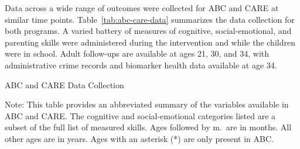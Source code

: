 Data across a wide range of outcomes were collected for ABC and CARE at similar time points. Table~\ref{tab:abc-care-data} summarizes the data collection for both programs. A varied battery of measures of cognitive, social-emotional, and parenting skills were administered during the intervention and while the children were in school. Adult follow-ups are available at ages 21, 30, and 34, with administrative crime records and biomarker health data available at age 34.

\begin{table}[H]
\centering
\caption{ABC and CARE Data Collection}
\label{tab:abc-care-data}
\begin{threeparttable}
\footnotesize
	
\begin{tablenotes}
\item Note: This table provides an abbreviated summary of the variables available in ABC and CARE. The cognitive and social-emotional categories listed are a subset of the full list of measured skills. Ages followed by m.\ are in months. All other ages are in years. Ages with an asterisk (*) are only present in ABC. 
\end{tablenotes}
\end{threeparttable}
\end{table}

